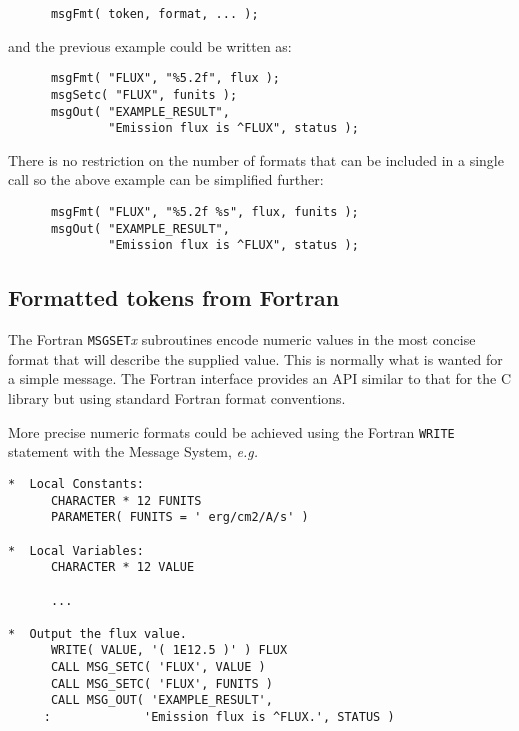 \documentclass[twoside,11pt]{article}
\newcommand{\xlabel}[1]{}
\renewcommand{\_}{\texttt{\symbol{95}}}
\newcommand{\func}[1]{\texttt{#1}}
\begin{document}
\begin{small}
\begin{verbatim}
      msgFmt( token, format, ... );
\end{verbatim}
\end{small}

and the previous example could be written as:

\begin{small}
\begin{verbatim}
      msgFmt( "FLUX", "%5.2f", flux );
      msgSetc( "FLUX", funits );
      msgOut( "EXAMPLE_RESULT",
              "Emission flux is ^FLUX", status );
\end{verbatim}
\end{small}

There is no restriction on the number of formats that can be included
in a single call so the above example can be simplified further:

\begin{small}
\begin{verbatim}
      msgFmt( "FLUX", "%5.2f %s", flux, funits );
      msgOut( "EXAMPLE_RESULT",
              "Emission flux is ^FLUX", status );
\end{verbatim}
\end{small}

\subsection{\xlabel{fortran_formatted_tokens}Formatted tokens from Fortran}

The Fortran \func{MSG\_SET}\textit{x} subroutines encode numeric values in the most concise
format that will describe the supplied value.
This is normally what is wanted for a simple message. The Fortran
interface provides an API similar to that for the C library but using
standard Fortran format conventions.

More precise numeric formats could be achieved using the Fortran \func{WRITE}
statement with the Message System, \textit{e.g.}

\begin {small}
\begin{verbatim}
*  Local Constants:
      CHARACTER * 12 FUNITS
      PARAMETER( FUNITS = ' erg/cm2/A/s' )

*  Local Variables:
      CHARACTER * 12 VALUE

      ...

*  Output the flux value.
      WRITE( VALUE, '( 1E12.5 )' ) FLUX
      CALL MSG_SETC( 'FLUX', VALUE )
      CALL MSG_SETC( 'FLUX', FUNITS )
      CALL MSG_OUT( 'EXAMPLE_RESULT',
     :             'Emission flux is ^FLUX.', STATUS )
\end{verbatim}
\end {small}
\end{document}

